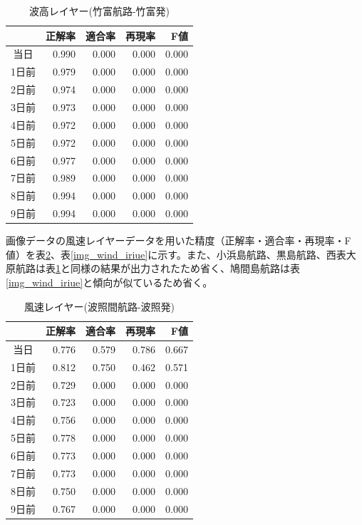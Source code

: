 \documentclass[twocolumn,twoside,9.5pt]{jsarticle}
\begin{document}
\begin{table}[H]
  \begin{center}
    \caption{波高レイヤー(竹富航路-竹富発)}
    \begin{tabular}{|c|r|r|r|r|} \hline
   &正解率 & 適合率 & 再現率 & F値 \\ \hline
      当日 & 0.990 & 0.000 & 0.000 & 0.000 \\ \hline
     1日前 & 0.979 & 0.000 & 0.000 & 0.000 \\ \hline
      2日前 & 0.974 & 0.000 & 0.000 & 0.000 \\ \hline
      3日前 & 0.973 & 0.000 & 0.000 & 0.000 \\ \hline 
      4日前 & 0.972 & 0.000 & 0.000 & 0.000 \\ \hline 
      5日前 & 0.972 & 0.000 & 0.000 & 0.000 \\ \hline 
      6日前 & 0.977 & 0.000 & 0.000 & 0.000 \\ \hline 
      7日前 & 0.989 & 0.000 & 0.000 & 0.000 \\ \hline 
      8日前 & 0.994 & 0.000 & 0.000 & 0.000 \\ \hline 
      9日前 & 0.994 & 0.000 & 0.000 & 0.000 \\ \hline 
    \end{tabular}    
    \label{img_wave_taketomi}
  \end{center}
\end{table}

画像データの風速レイヤーデータを用いた精度（正解率・適合率・再現率・F値）を表\ref{img_wind_hateruma}、表\ref{img_wind_iriue}に示す。また、小浜島航路、黒島航路、西表大原航路は表\ref{img_wave_taketomi}と同様の結果が出力されたため省く、鳩間島航路は表\ref{img_wind_iriue}と傾向が似ているため省く。

\begin{table}[H]
  \begin{center}
    \caption{風速レイヤー(波照間航路-波照発)}
    \begin{tabular}{|c|r|r|r|r|} \hline
   &正解率 & 適合率 & 再現率 & F値 \\ \hline
      当日&0.776 &0.579 &0.786 &0.667 \\ \hline
     1日前 & 0.812 & 0.750 & 0.462 & 0.571 \\ \hline
      2日前 & 0.729 & 0.000 & 0.000 & 0.000 \\ \hline
      3日前 & 0.723 & 0.000 & 0.000 & 0.000 \\ \hline 
      4日前 & 0.756 & 0.000 & 0.000 & 0.000 \\ \hline 
      5日前 & 0.778 & 0.000 & 0.000 & 0.000 \\ \hline 
      6日前 & 0.773 & 0.000 & 0.000 & 0.000 \\ \hline 
      7日前 & 0.773 & 0.000 & 0.000 & 0.000 \\ \hline 
      8日前 & 0.750 & 0.000 & 0.000 & 0.000 \\ \hline 
      9日前 & 0.767 & 0.000 & 0.000 & 0.000 \\ \hline 
    \end{tabular}    
    \label{img_wind_hateruma}
  \end{center}
\end{table}
\end{document}
